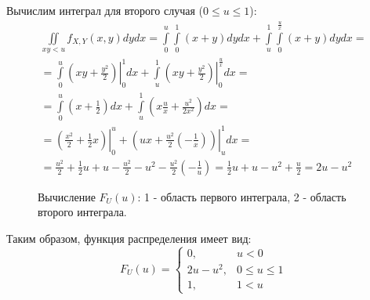 \begin{enumerate}
    Вычислим интеграл для второго случая ($0 \le u \le 1$):
    \begin{multline}
        \iint \limits_{xy < u} f_{X,Y}(x, y) dy dx
        = \int \limits_0^u \int \limits_0^1 ( x + y ) dy dx + \int \limits_u^1 \int \limits_0^{\frac{u}{x}} ( x + y ) dy dx = \\
        = \int \limits_0^u \left . \left ( x y + \frac{y^2}{2} \right ) \right |_0^1 dx + \int \limits_u^1 \left . \left ( x y + \frac{y^2}{2} \right ) \right |_0^{\frac{u}{x}} dx = \\
        = \int \limits_0^u \left ( x + \frac{1}{2} \right ) dx + \int \limits_u^1 \left ( x \frac{u}{x} + \frac{u^2}{2x^2} \right ) dx = \\
        = \left . \left ( \frac{x^2}{2} + \frac{1}{2} x \right ) \right |_0^u + \left . \left ( u x + \frac{u^2}{2} \left ( - \frac{1}{x} \right ) \right ) \right |_u^1 dx = \\
        = \frac{u^2}{2} + \frac{1}{2} u + u - \frac{u^2}{2} - u^2 - \frac{u^2}{2} \left ( - \frac{1}{u} \right )
        = \frac{1}{2} u + u - u^2 + \frac{u}{2}
        = 2 u - u^2
    \end{multline}

    \begin{figure}[!h]
        \center
        \caption{Вычисление $F_U(u)$: 1 - область первого интеграла, 2 - область второго интеграла.}
    \end{figure}

    Таким образом, функция распределения имеет вид:
    \begin{equation}
        F_U(u)
        = \left \{
        \begin{array}{ll}
            0,         & u < 0         \\
            2 u - u^2, & 0 \le u \le 1 \\
            1,         & 1 < u
        \end{array}
        \right .
    \end{equation}


\end{enumerate}
